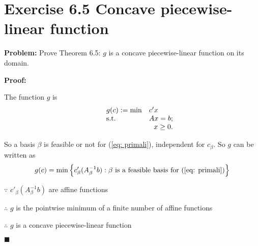 \section{Exercise 6.5 Concave piecewise-linear function}
\textbf{Problem:} Prove Theorem 6.5: $g$ is a concave piecewise-linear function on its domain.

\textbf{Proof:}
 
The function $g$ is 
\begin{equation}
\label{eq: primali}
  \begin{array}{lrcll}
    g(c):=\min
    & \multicolumn{4}{l}{c'x} \\
    \text{s.t.}
    & Ax=b;\\
    & x\geq0.
  \end{array}
\end{equation}

So a basis $\beta$ is feasible or not for (\ref{eq: primali}), independent for $c_{\beta}$. So $g$ can be written as
\[
g(c)=\min\left\lbrace{}c'_{\beta}(A^{-1}_{\beta}b): \text{$\beta$ is a feasible basis for (\ref{eq: primali}})\right\rbrace
\]

$\because $ $c'_{\beta}(A^{-1}_{\beta}b)$ are affine functions

$\therefore$ $g$ is the pointwise minimum of a finite number of affine functions

$\therefore$ $g$ is a concave piecewise-linear function
\begin{flushright} $\blacksquare$ \end{flushright}